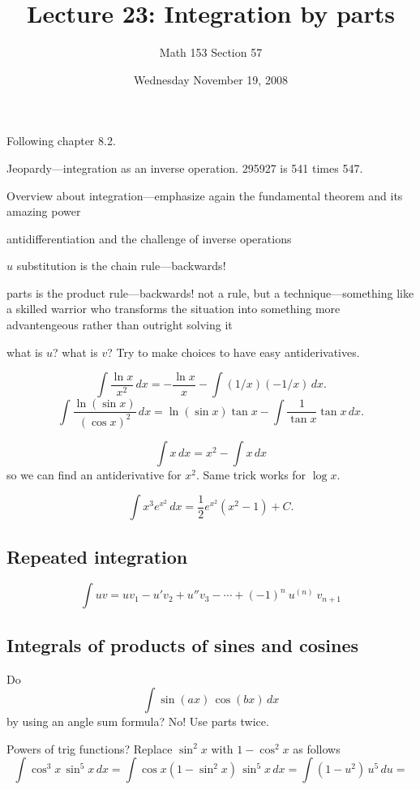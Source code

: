 \documentclass[12pt]{article}
\title{Lecture 23: Integration by parts}
\author{Math 153 Section 57}
\date{Wednesday November 19, 2008}
\begin{document}
\maketitle

Following chapter 8.2.

Jeopardy---integration as an inverse operation.  295927 is 541 times 547.

Overview about integration---emphasize again the fundamental theorem
and its amazing power

antidifferentiation and the challenge of inverse operations

$u$ substitution is the chain rule---backwards!

parts is the product rule---backwards!  not a rule, but a
technique---something like a skilled warrior who transforms the
situation into something more advantengeous rather than outright solving it

what is $u$?  what is $v$?  Try to make choices to have easy
antiderivatives.

$$
\int \frac{\ln x}{x^2}\, dx = -\frac{\ln x}{x} - \int (1/x)(-1/x)\, dx.
$$
$$
\int \frac{\ln(\sin x)}{(\cos x)^2}\, dx = \ln(\sin x)\tan x - \int \frac{1}{\tan x} \tan x\, dx.
$$

$$
\int x\, dx = x^2 - \int x\, dx
$$
so we can find an antiderivative for $x^2$.  Same trick works for $\log x$.

$$
\int x^3e^{x^2}\, dx=\frac{1}{2}e^{x^2}(x^2-1)+C.
$$

\subsection*{Repeated integration}

$$\int uv = u v_1 - u' v_2 + u'' v_3 - \cdots + (-1)^{n}\ u^{(n)} \ v_{n+1}
$$

\subsection*{Integrals of products of sines and cosines}

Do
$$
\int \sin(ax) \, \cos(bx) \, dx
$$
by using an angle sum formula? No!  Use parts twice.

Powers of trig functions?  Replace $\sin^2 x$ with $1 - \cos^2 x$ as follows
$$
\int \cos^3 x \, \sin^5 x \, dx = 
\int \cos x (1 - \sin^2 x) \, \sin^5 x \, dx = 
\int  (1 - u^2) \, u^5 \, du = 
$$
\end{document}

